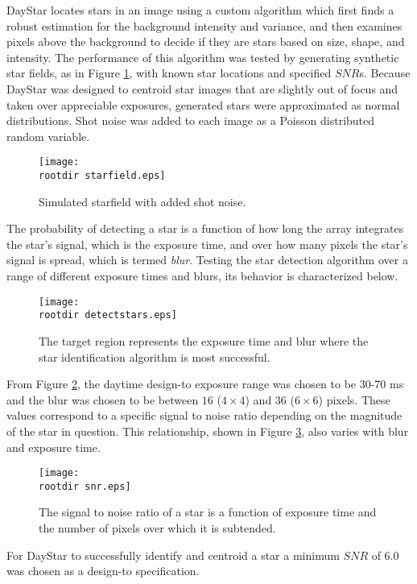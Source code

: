 \documentclass[twocolumn,letterpaper]{IEEEAerospace2012}
\newcommand{\rootdir}{./Figures/}
\newcommand{\SNR}{\mathit{SNR}}
\begin{document}
DayStar locates stars in an image using a custom algorithm which first finds a robust estimation for the background intensity and variance, and then examines pixels above the background to decide if they are stars based on size, shape, and intensity. The performance of this algorithm was tested by generating synthetic star fields, as in Figure \ref{fig:starfield}, with known star locations and specified $\SNR$s. Because DayStar was designed to centroid star images that are slightly out of focus and taken over appreciable exposures, generated stars were approximated as normal distributions. Shot noise was added to each image as a Poisson distributed random variable.
\begin{figure}
    \centering
    \texttt{[image: \\rootdir starfield.eps]}
    \caption{Simulated starfield with added shot noise.}
    \label{fig:starfield}
\end{figure}
The probability of detecting a star is a function of how long the array integrates the star's signal, which is the exposure time, and over how many pixels the star's signal is spread, which is termed \emph{blur}. Testing the star detection algorithm over a range of different exposure times and blurs, its behavior is characterized below.
\begin{figure}[H]
    \centering
    \texttt{[image: \\rootdir detectstars.eps]}
    \caption{The target region represents the exposure time and blur where the star identification algorithm is most successful.}
    \label{fig:detectstars}
\end{figure}
From Figure \ref{fig:detectstars}, the daytime design-to exposure range was chosen to be 30-70 ms and the blur was chosen to be between $16$ ($4 \times 4$) and $36$ ($6 \times 6$) pixels. These values correspond to a specific signal to noise ratio depending on the magnitude of the star in question. This relationship, shown in Figure \ref{fig:snr}, also varies with blur and exposure time.
\begin{figure}
    \centering
    \texttt{[image: \\rootdir snr.eps]}
    \caption{The signal to noise ratio of a star is a function of exposure time and the number of pixels over which it is subtended.}
    \label{fig:snr}
\end{figure}
For DayStar to successfully identify and centroid a star a minimum $\SNR$ of 6.0 was chosen as a design-to specification.

\end{document}
